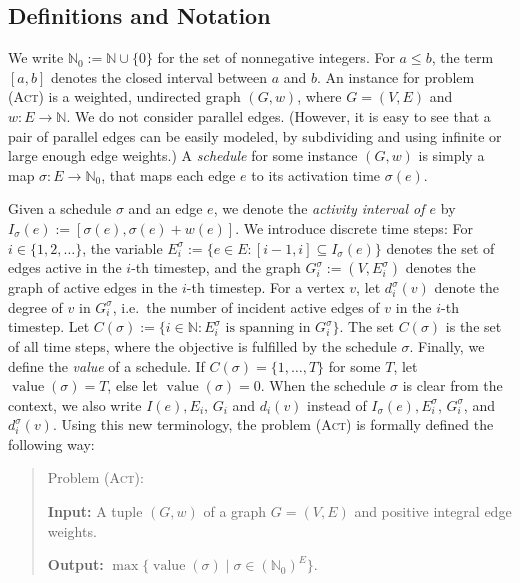 \documentclass[runningheads]{llncs}
\numberwithin{equation}{section}
\newcommand{\N}{\mathbb{N}}
\newcommand{\set}[1]{\{ #1 \}}
\newcommand{\fromto}[2]{\set{#1, \ldots, #2}}
\newcommand{\act}{\textsc{(Act)}}
\DeclareMathOperator{\val}{\text{value}}
\begin{document}
\subsection{Definitions and Notation}
\label{sec_notation}

We write $\N_0 := \N \cup \set{0}$ for the set of nonnegative integers. For $a \leq b$, the term $[a, b]$ denotes the closed interval between $a$ and $b$. An instance for problem {\act} is a weighted, undirected graph $(G, w)$, where $G = (V, E)$ and $w : E \rightarrow \N$. We do not consider parallel edges. (However, it is easy to see that a pair of parallel edges can be easily modeled, by subdividing and using infinite or large enough edge weights.) A \emph{schedule} for some instance $(G, w)$ is simply a map $\sigma : E \rightarrow \N_0$, that maps each edge $e$ to its activation time $\sigma(e)$. 

Given a schedule $\sigma$ and an edge $e$, we denote the \emph{activity interval of $e$} by $I_\sigma(e) := [\sigma(e), \sigma(e) + w(e)]$. We introduce discrete time steps: For $i \in \{1, 2, \dots\}$, the variable $E^\sigma_i := \set{e \in E : [i-1, i] \subseteq I_\sigma(e)}$ denotes the set of edges active in the $i$-th timestep, and the graph $G^\sigma_i := (V, E^\sigma_i)$ denotes the graph of active edges in the $i$-th timestep. For a vertex $v$, let $d^\sigma_i(v)$ denote the degree of $v$ in $G^\sigma_i$, i.e.\ the number of incident active edges of $v$ in the $i$-th timestep.
Let $C(\sigma) := \set{i \in \N : E_i^\sigma \text{ is spanning in } G^\sigma_i}$. The set $C(\sigma)$ is the set of all time steps, where the objective is fulfilled by the schedule $\sigma$. Finally, we define the \emph{value} of a schedule. If $C(\sigma) = \fromto{1}{T}$ for some $T$, let $\val(\sigma) = T$, else let $\val(\sigma) = 0$. When the schedule $\sigma$ is clear from the context, we also write $I(e), E_i$, $G_i$ and $d_i(v)$ instead of $I_\sigma(e), E^\sigma_i$, $G^\sigma_i$, and $d^\sigma_i(v)$. Using this new terminology, the problem {\act} is formally defined the following way:

\begin{quote}
Problem {\act}: 

\textbf{Input:} A tuple $(G, w)$ of a graph $G = (V,E)$ and positive integral edge weights.

\textbf{Output:} $\max\set{\val(\sigma) \mid \sigma \in (\N_0)^E}$.
\end{quote}
\end{document}
